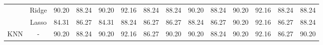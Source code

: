 \begin{landscape}
\begin{table}[]
{\begin{tabular}{cc|clllllclllll}
                                & Ridge                                 & 90.20                                                             & 88.24                                                                & 90.20                                                                & 92.16                                                               & 88.24                                                            & \multicolumn{1}{c|}{88.24}                                                                   & 90.20                                                             & 88.24                                                                & 90.20                                                                & 92.16                                                               & 88.24                                                            & 88.24                                                                   \\
                                & Lasso                                 & 84.31                                                             & 86.27                                                                & 84.31                                                                & 88.24                                                               & 86.27                                                            & \multicolumn{1}{c|}{86.27}                                                                   & 88.24                                                             & 86.27                                                                & 90.20                                                                & 92.16                                                               & 86.27                                                            & 88.24                                                                   \\ \hline
KNN                             & -                                     & 90.20                                                             & 88.24                                                                & 90.20                                                                & 92.16                                                               & 86.27                                                            & \multicolumn{1}{c|}{90.20}                                                                   & 90.20                                                             & 88.24                                                                & 90.20                                                                & 92.16                                                               & 86.27                                                            & 90.20                                                                   \\ \hline

\end{tabular}}
\end{table}
\end{landscape}
